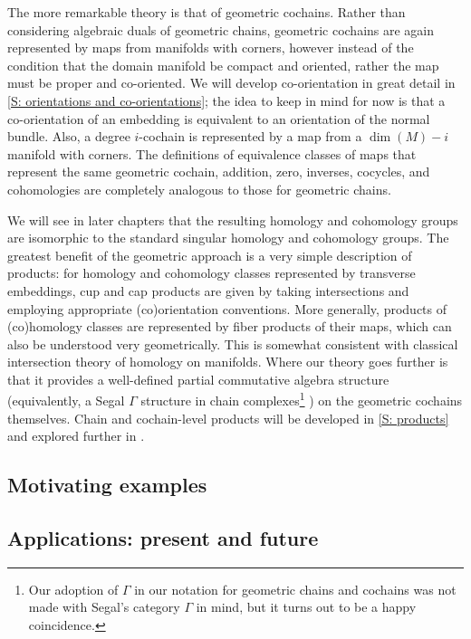 The more remarkable theory is that of geometric cochains.
Rather than considering algebraic duals of geometric chains, geometric cochains are again represented by maps from manifolds with corners, however instead of the condition that the domain manifold be compact and oriented, rather the map must be proper and co-oriented.
We will develop co-orientation in great detail in \cref{S: orientations and co-orientations}; the idea to keep in mind for now is that a co-orientation of an embedding is equivalent to an orientation of the normal bundle.
Also, a degree $i$-cochain is represented by a map from a $\dim(M)-i$ manifold with corners.
The definitions of equivalence classes of maps that represent the same geometric cochain, addition, zero, inverses, cocycles, and cohomologies are completely analogous to those for geometric chains.

We will see in later chapters that the resulting homology and cohomology groups are isomorphic to the standard singular homology and cohomology groups.
The greatest benefit of the geometric approach is a very simple description of products: for homology and cohomology classes represented by transverse embeddings, cup and cap products are given by taking intersections and employing appropriate (co)orientation conventions.
More generally, products of (co)homology classes are represented by fiber products of their maps, which can also be understood very geometrically.
This is somewhat consistent with classical intersection theory of homology on manifolds.
Where our theory goes further is that it provides a well-defined partial commutative algebra structure \cite{McC} (equivalently, a Segal $\Gamma$ structure in chain complexes\footnote{Our adoption of $\Gamma$ in our notation for geometric chains and cochains was not made with Segal's category $\Gamma$ in mind, but it turns out to be a happy coincidence.} \cite{Se74}) on the geometric cochains themselves.
Chain and cochain-level products will be developed in \cref{S: products} and explored further in \cite{GBF47}.

\subsection{Motivating examples}



\subsection{Applications: present and future}


